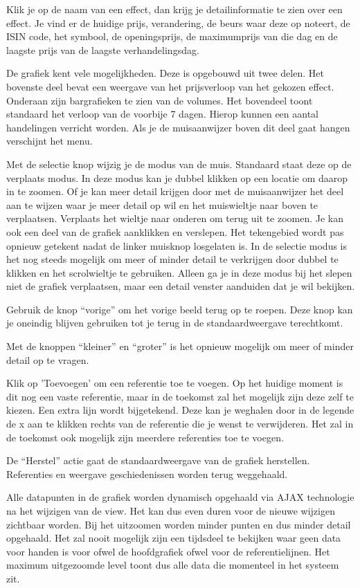 Klik je op de naam van een effect, dan krijg je detailinformatie te zien over een effect.
Je vind er de huidige prijs, verandering, de beurs waar deze op noteert, de ISIN code, het symbool, de openingsprijs, de maximumprijs van die dag en de laagste prijs van de laagste verhandelingsdag.

De grafiek kent vele mogelijkheden.
Deze is opgebouwd uit twee delen. Het bovenste deel bevat een weergave van het prijsverloop van het gekozen effect. Onderaan zijn bargrafieken te zien van de volumes. Het bovendeel toont standaard het verloop van de voorbije 7 dagen. Hierop kunnen een aantal handelingen verricht worden.
Als je de muisaanwijzer boven dit deel gaat hangen verschijnt het menu.

Met de selectie knop wijzig je de modus van de muis. Standaard staat deze op de verplaats modus.
In deze modus kan je dubbel klikken op een locatie om daarop in te zoomen. Of je kan meer detail krijgen door met de muisaanwijzer het deel aan te wijzen waar je meer detail op wil en het muiswieltje naar boven te verplaatsen. Verplaats het wieltje naar onderen om terug uit te zoomen.
Je kan ook een deel van de grafiek aanklikken en verslepen. Het tekengebied wordt pas opnieuw getekent nadat de linker muisknop losgelaten is.
In de selectie modus is het nog steeds mogelijk om meer of minder detail te verkrijgen door dubbel te klikken en het scrolwieltje te gebruiken.
Alleen ga je in deze modus bij het slepen niet de grafiek verplaatsen, maar een detail venster aanduiden dat je wil bekijken.

Gebruik de knop ``vorige'' om het vorige beeld terug op te roepen. Deze knop kan je oneindig blijven gebruiken tot je terug in de standaardweergave terechtkomt.

Met de knoppen ``kleiner'' en ``groter'' is het opnieuw mogelijk om meer of minder detail op te vragen.

Klik op 'Toevoegen' om een referentie toe te voegen. Op het huidige moment is dit nog een vaste referentie, maar in de toekomst zal het mogelijk zijn deze zelf te kiezen. Een extra lijn wordt bijgetekend. Deze kan je weghalen door in de legende de x aan te klikken rechts van de referentie die je wenst te verwijderen.
Het zal in de toekomst ook mogelijk zijn meerdere referenties toe te voegen.

De ``Herstel'' actie gaat de standaardweergave van de grafiek herstellen. Referenties en weergave geschiedenissen worden terug weggehaald.

Alle datapunten in de grafiek worden dynamisch opgehaald via AJAX technologie na het wijzigen van de view. Het kan dus even duren voor de nieuwe wijzigen zichtbaar worden. Bij het uitzoomen worden minder punten en dus minder detail opgehaald. Het zal nooit mogelijk zijn een tijdsdeel te bekijken waar geen data voor handen is voor ofwel de hoofdgrafiek ofwel voor de referentielijnen. Het maximum uitgezoomde level toont dus alle data die momenteel in het systeem zit.

